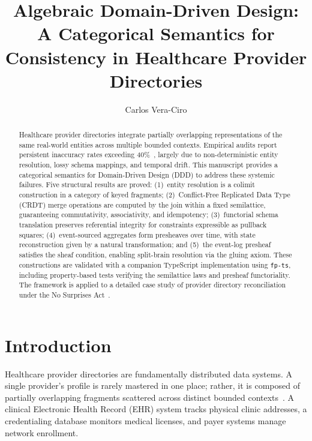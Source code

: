 \documentclass[11pt,a4paper]{article}
\title{\textbf{Algebraic Domain-Driven Design:\\
A Categorical Semantics for Consistency in Healthcare Provider Directories}}
\author{Carlos Vera-Ciro}
\date{}
\begin{document}
\maketitle

\begin{abstract}
Healthcare provider directories integrate partially overlapping
representations of the same real-world entities across multiple bounded
contexts. Empirical audits report persistent inaccuracy rates exceeding
40\%~\citep{cms2018,gao2018}, largely due to non-deterministic entity
resolution, lossy schema mappings, and temporal drift. This manuscript provides a
categorical semantics for Domain-Driven Design (DDD) to address these
systemic failures. Five structural results are proved: (1)~entity
resolution is a colimit construction in a category of keyed fragments;
(2)~Conflict-Free Replicated Data Type (CRDT) merge operations are computed by the join within a
fixed semilattice, guaranteeing commutativity, associativity, and
idempotency; (3)~functorial schema translation preserves referential
integrity for constraints expressible as pullback squares;
(4)~event-sourced aggregates form presheaves over time, with state
reconstruction given by a natural transformation; and (5)~the event-log
presheaf satisfies the sheaf condition, enabling split-brain resolution
via the gluing axiom. These
constructions are validated with a companion TypeScript implementation using \texttt{fp-ts},
including property-based tests verifying the semilattice laws and presheaf
functoriality. The framework is applied to a detailed case study of
provider directory reconciliation under the No Surprises
Act~\citep{nosurprisesact2022}.
\end{abstract}

\section{Introduction}
\label{sec:introduction}

Healthcare provider directories are fundamentally distributed data
systems. A single provider's profile is rarely mastered in one place;
rather, it is composed of partially overlapping fragments scattered
across distinct bounded contexts~\citep{evans2004}. A clinical Electronic
Health Record (EHR) system tracks physical clinic addresses, a
credentialing database monitors medical licenses, and payer systems
manage network enrollment.
\end{document}

